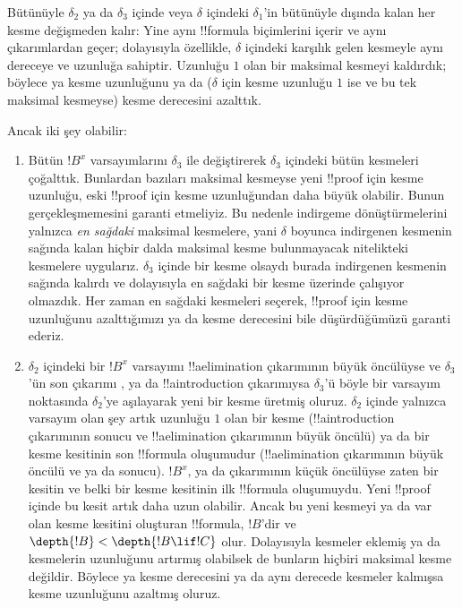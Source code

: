 Bütünüyle $\delta_2$ ya da $\delta_3$ içinde veya $\delta$ içindeki
$\delta_1$'in bütünüyle dışında kalan her kesme değişmeden kalır: Yine
aynı !!{formula} biçimlerini içerir ve aynı çıkarımlardan geçer; dolayısıyla
özellikle, $\delta$ içindeki karşılık gelen kesmeyle aynı dereceye ve
uzunluğa sahiptir. Uzunluğu $1$ olan bir maksimal kesmeyi kaldırdık;
böylece ya kesme uzunluğunu ya da ($\delta$ için kesme uzunluğu $1$ ise
ve bu tek maksimal kesmeyse) kesme derecesini azalttık.

Ancak iki şey olabilir:
\begin{enumerate}
  \item Bütün $!B^x$ varsayımlarını $\delta_3$ ile değiştirerek
  $\delta_3$ içindeki bütün kesmeleri çoğalttık. Bunlardan bazıları
  maksimal kesmeyse yeni !!{proof} için kesme uzunluğu, eski !!{proof}
  için kesme uzunluğundan daha büyük olabilir. Bunun gerçekleşmemesini
  garanti etmeliyiz. Bu nedenle indirgeme dönüştürmelerini yalnızca
  \emph{en sağdaki} maksimal kesmelere, yani $\delta$ boyunca indirgenen
  kesmenin sağında kalan hiçbir dalda maksimal kesme bulunmayacak
  nitelikteki kesmelere uygularız. $\delta_3$ içinde bir kesme olsaydı
  burada indirgenen kesmenin sağında kalırdı ve dolayısıyla en sağdaki
  bir kesme üzerinde çalışıyor olmazdık. Her zaman en sağdaki kesmeleri
  seçerek, !!{proof} için kesme uzunluğunu azalttığımızı ya da kesme
  derecesini bile düşürdüğümüzü garanti ederiz.
  \item $\delta_2$ içindeki bir $!B^x$ varsayımı !!a{elimination}
  çıkarımının büyük öncülüyse ve $\delta_3$'ün son çıkarımı
  \Elim{\lor}, \Elim{\lexists} ya da !!a{introduction} çıkarımıysa
  $\delta_3$'ü böyle bir varsayım noktasında $\delta_2$'ye aşılayarak
  yeni bir kesme üretmiş oluruz. $\delta_2$ içinde yalnızca varsayım
  olan şey artık uzunluğu $1$ olan bir kesme (!!a{introduction}
  çıkarımının sonucu ve !!a{elimination} çıkarımının büyük öncülü) ya
  da bir kesme kesitinin son !!{formula} oluşumudur (!!a{elimination}
  çıkarımının büyük öncülü ve \Elim{\lor} ya da \Elim{\lexists}
  sonucu). $!B^x$, \Elim{\lor} ya da \Elim{\lexists} çıkarımının küçük
  öncülüyse zaten bir kesitin ve belki bir kesme kesitinin ilk
  !!{formula} oluşumuydu. Yeni !!{proof} içinde bu kesit artık daha uzun
  olabilir. Ancak bu yeni kesmeyi ya da var olan kesme kesitini oluşturan
  !!{formula}, $!B$'dir ve $\depth{!B} < \depth{!B \lif !C}$ olur.
  Dolayısıyla kesmeler eklemiş ya da kesmelerin uzunluğunu artırmış
  olabilsek de bunların hiçbiri maksimal kesme değildir. Böylece ya
  kesme derecesini ya da aynı derecede kesmeler kalmışsa kesme
  uzunluğunu azaltmış oluruz.
\end{enumerate}

